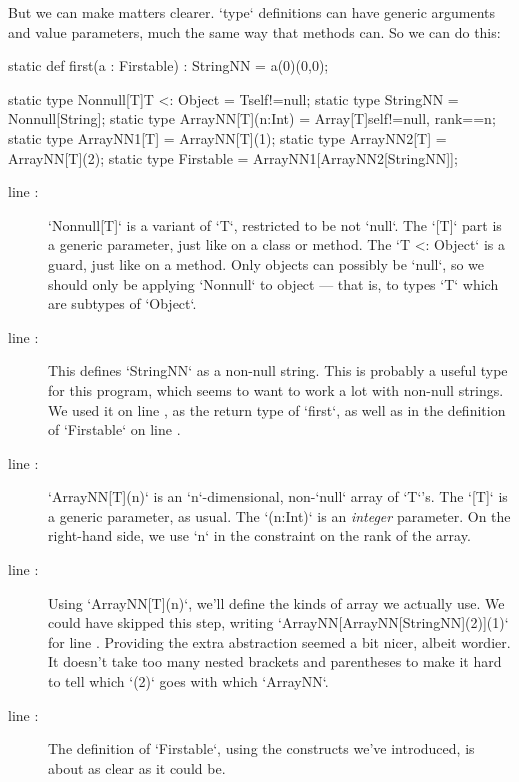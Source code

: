 But we can make matters clearer. \xcd`type` definitions can have generic
arguments and value parameters, much the same way that methods can.  So we can
do this:
\begin{xtennum}[]
static def first(a : Firstable) : StringNN = a(0)(0,0);

static type Nonnull[T]{T <: Object} = T{self!=null};
static type StringNN = Nonnull[String];
static type ArrayNN[T](n:Int) = Array[T]{self!=null, rank==n};
static type ArrayNN1[T] = ArrayNN[T](1);
static type ArrayNN2[T] = ArrayNN[T](2);
static type Firstable = ArrayNN1[ArrayNN2[StringNN]];
\end{xtennum}

\begin{description}

\item [line :]  \xcd`Nonnull[T]` is a variant
      of \xcd`T`, restricted to be not \xcd`null`.  The \xcd`[T]` part is a
      generic parameter, just like on a class or method. The 
      \xcd`{T <: Object}` is a guard, just like on a method.  Only objects can
      possibly 
      be \xcd`null`, so we should only be applying \xcd`Nonnull` to object ---
      that is, to types \xcd`T` which are subtypes of \xcd`Object`.  

\item [line :] This defines \xcd`StringNN` as
      a non-null string.  This is probably a useful type for this program,
      which seems to want to work a lot with non-null strings.  We used it on
      line , as the return type of \xcd`first`,
      as well as in the definition of \xcd`Firstable` on line
      . 

\item [line :] \xcd`ArrayNN[T](n)` is an
      \xcd`n`-dimensional, non-\xcd`null` array of \xcd`T`'s.  The \xcd`[T]`
      is a generic parameter, as usual. The \xcd`(n:Int)` is an {\em integer}
      parameter. On the right-hand side, we use \xcd`n` in the constraint on
      the rank of the array.

\item [line :] Using \xcd`ArrayNN[T](n)`, we'll
      define the kinds of array we actually use.  We could have skipped this
      step, writing \xcd`ArrayNN[ArrayNN[StringNN](2)](1)` for line 
      .  Providing the extra abstraction
      seemed a bit nicer, albeit wordier. It doesn't take too many nested
      brackets and parentheses to make it hard to tell which \xcd`(2)` goes
      with which \xcd`ArrayNN`.  

\item [line :] The definition of
      \xcd`Firstable`, using the constructs we've introduced, is about as
      clear as it could be.   
\end{description}


